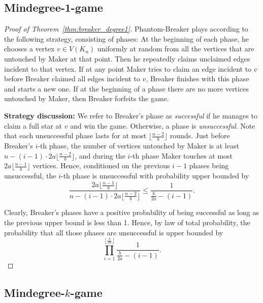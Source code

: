 \documentclass[11pt, a4paper]{article}
\numberwithin{equation}{section}
\numberwithin{figure}{section}
\begin{document}
\subsection{Mindegree-1-game}

\begin{proof}[Proof of Theorem~\ref{thm:breaker_degree1}]
Phantom-Breaker plays according to the following strategy, consisting of phases: At the beginning of each phase, he chooses a vertex $v \in V(K_n)$ uniformly at random from all the vertices that are untouched by Maker at that point. Then he repeatedly claims unclaimed edges incident to that vertex. If at any point Maker tries to claim an edge incident to $v$ before Breaker claimed all edges incident to $v$, Breaker finishes with this phase and starts a new one. If at the beginning of a phase there are no more vertices untouched by Maker, then Breaker forfeits the game.

\smallskip

\textbf{Strategy discussion:}
We refer to Breaker's phase as \emph{successful} if he manages to claim a full star at $v$ and win the game. Otherwise, a phase is \emph{unsuccessful}. Note that each unsuccessful phase lasts for at most $\lfloor \frac{n-2}{b} \rfloor$ rounds. Just before Breaker's $i$-th phase, the number of vertices untouched by Maker is at least $n - (i-1)\cdot 2a\lfloor \frac{n-2}{b}\rfloor$, and during the $i$-th phase Maker touches at most $2a\lfloor \frac{n-1}{b}\rfloor$ vertices. Hence, conditioned on the previous $i-1$ phases being unsuccessful, the $i$-th phase is unsuccessful with probability upper bounded by
$$\frac{2a\lfloor \frac{n-1}{b}\rfloor}{n - (i-1)\cdot 2a\lfloor \frac{n-2}{b}\rfloor} \leq  \frac{1}{\frac{b}{2a}-(i-1)}. $$

Clearly, Breaker's phases have a positive probability of being successful as long as the previous upper bound is less than 1. Hence, by law of total probability, the probability that all those phases are unsuccessful is upper bounded by
$$ \prod_{i=1}^{\left\lfloor\frac{b}{2a}\right\rfloor} \frac{1}{\frac{b}{2a}-(i-1)}.$$
\end{proof}



\subsection{Mindegree-$k$-game}
\end{document}
